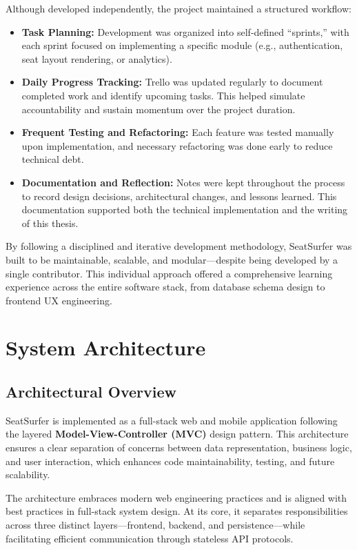 \documentclass[12pt,a4paper]{report} %
\begin{document}
\noindent
Although developed independently, the project maintained a structured workflow:
\begin{itemize}
    \item \textbf{Task Planning:} Development was organized into self-defined “sprints,” with each sprint focused on implementing a specific module (e.g., authentication, seat layout rendering, or analytics).
    \item \textbf{Daily Progress Tracking:} Trello was updated regularly to document completed work and identify upcoming tasks. This helped simulate accountability and sustain momentum over the project duration.
    \item \textbf{Frequent Testing and Refactoring:} Each feature was tested manually upon implementation, and necessary refactoring was done early to reduce technical debt.
    \item \textbf{Documentation and Reflection:} Notes were kept throughout the process to record design decisions, architectural changes, and lessons learned. This documentation supported both the technical implementation and the writing of this thesis.
\end{itemize}

\noindent
By following a disciplined and iterative development methodology, SeatSurfer was built to be maintainable, scalable, and modular—despite being developed by a single contributor. This individual approach offered a comprehensive learning experience across the entire software stack, from database schema design to frontend UX engineering.

\newpage

\section{System Architecture}

\subsection{Architectural Overview}

SeatSurfer is implemented as a full-stack web and mobile application following the layered \textbf{Model-View-Controller (MVC)} design pattern. This architecture ensures a clear separation of concerns between data representation, business logic, and user interaction, which enhances code maintainability, testing, and future scalability.

The architecture embraces modern web engineering practices and is aligned with best practices in full-stack system design. At its core, it separates responsibilities across three distinct layers—frontend, backend, and persistence—while facilitating efficient communication through stateless API protocols.
\end{document}
